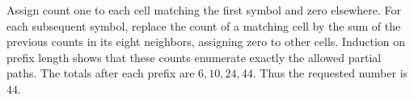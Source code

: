Assign count one to each cell matching the first symbol and zero elsewhere. For each subsequent symbol, replace the count of a matching cell by the sum of the previous counts in its eight neighbors, assigning zero to other cells. Induction on prefix length shows that these counts enumerate exactly the allowed partial paths. The totals after each prefix are $6,10,24,44$. Thus the requested number is $\boxed{44}$.
